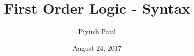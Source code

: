 \documentclass{article}
\begin{document}
\newcommand{\N}{\mathbb{N}}
\newcommand{\Z}{\mathbb{Z}}
\newcommand{\Q}{\mathbb{Q}}
\newcommand{\R}{\mathbb{R}}
\newcommand{\T}{\text{\normalfont\ T}}
\newcommand{\F}{\text{\normalfont\ F}}
\newcommand{\ti}{\textit}
\newcommand{\tb}{\textbf}
\newcommand{\n}{\leavevmode \newline}
\newcommand{\nn}{\leavevmode \newline \newline}
\def \Def#1#2{\begin{adjustwidth}{0.85cm}{0.85cm} \tb{(Definition) #1}: \ti{#2} \end{adjustwidth}}
\def \nDef#1#2{\n \Def{#1}{#2}}
\def \Defn#1#2{\Def{#1}{#2} \n}
\def \nDefn#1#2{\n \Defn{#1}{#2}}
\def \Defcont#1{\begin{adjustwidth}{0.85cm}{0.85cm} \ti{#1} \end{adjustwidth} \n}
\def \InDef#1{\ti{\begin{adjustwidth}{0.85cm}{0.85cm} #1 \end{adjustwidth}}}
\def \Thm#1#2{\begin{adjustwidth}{0.85cm}{0.85cm} \tb{(Theorem) #1}: \ti{#2} \end{adjustwidth}}
\def \nThm#1#2{\n \Thm{#1}{#2}}
\def \Thmn#1#2{\Thm{#1}{#2} \n}
\def \nThmn#1#2{\n \Thmn{#1}{#2}}
\def \InThm#1{\ti{\begin{adjustwidth}{0.85cm}{0.85cm} #1 \end{adjustwidth}}}
\def \Pf#1{\begin{adjustwidth}{0.85cm}{0.85cm} \textit{Proof}: #1 \qedsymbol \end{adjustwidth} \nn}
\newcommand{\st}{\textnormal{ s.t. }}
\newcommand{\proplang}{\mathcal{L}_0}

\title{First Order Logic - Syntax}
\author{Piyush Patil}
\date{August 24, 2017}
\maketitle
\end{document}
